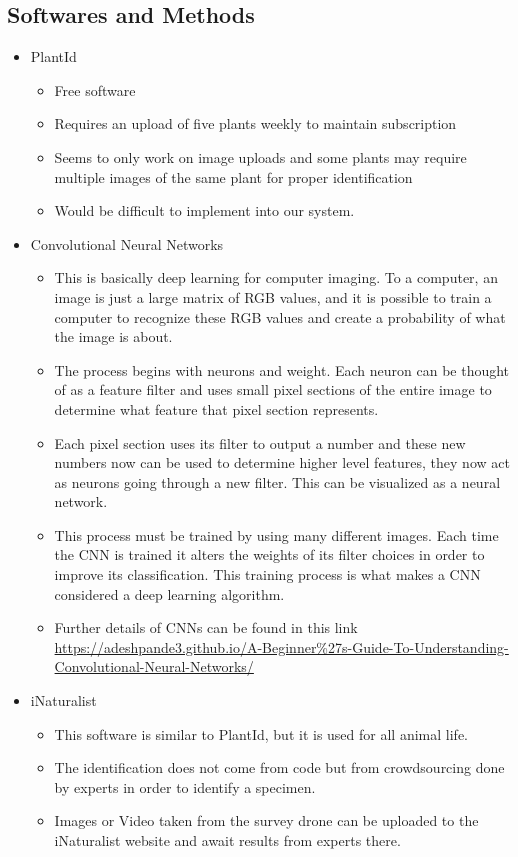 \subsection{Softwares and Methods}
\begin{itemize}
\item PlantId
\begin{itemize}
\item Free software 
\item Requires an upload of five plants weekly to maintain subscription
\item Seems to only work on image uploads and some plants may require multiple images of the same plant for proper identification
\item Would be difficult to implement into our system.
\end{itemize}
\item Convolutional Neural Networks
\begin{itemize}
\item This is basically deep learning for computer imaging. To a computer, an image is just a large matrix of RGB values, and it is possible to train a computer to recognize these RGB values and create a probability of what the image is about.
\item The process begins with neurons and weight. Each neuron can be thought of as a feature filter and uses small pixel sections of the entire image to determine what feature that pixel section represents.
\item Each pixel section uses its filter to output a number and these new numbers now can be used to determine higher level features, they now act as neurons going through a new filter. This can be visualized as a neural network. 
\item This process must be trained by using many different images. Each time the CNN is trained it alters the weights of its filter choices in order to improve its classification. This training process is what makes a CNN considered a deep learning algorithm. 
\item Further details of CNNs can be found in this link \url{https://adeshpande3.github.io/A-Beginner\%27s-Guide-To-Understanding-Convolutional-Neural-Networks/}
\end{itemize}
\item iNaturalist
\begin{itemize}
\item This software is similar to PlantId, but it is used for all animal life.
\item The identification does not come from code but from crowdsourcing done by experts in order to identify a specimen.
\item Images or Video taken from the survey drone can be uploaded to the iNaturalist website and await results from experts there.
\end{itemize}
\end{itemize}
